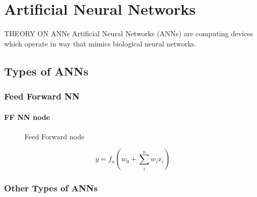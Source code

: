 \chapter{Artificial Neural Networks}

THEORY ON ANNs
Artificial Neural Networks (ANNs) are computing devices which operate in way that mimics biological neural networks.
\section{Types of ANNs}
\subsection{Feed Forward NN}
\subsubsection{FF NN node}
\begin{figure}[ht]
	\centering
	
	\caption{Feed Forward node}
	\label{fig:FF_node}
\end{figure}
\begin{equation}
y = f_a \left(  w_0 + \sum_i^n w_i x_i \right)
\label{eq:node_function}
\end{equation}
\subsection{Other Types of ANNs}
